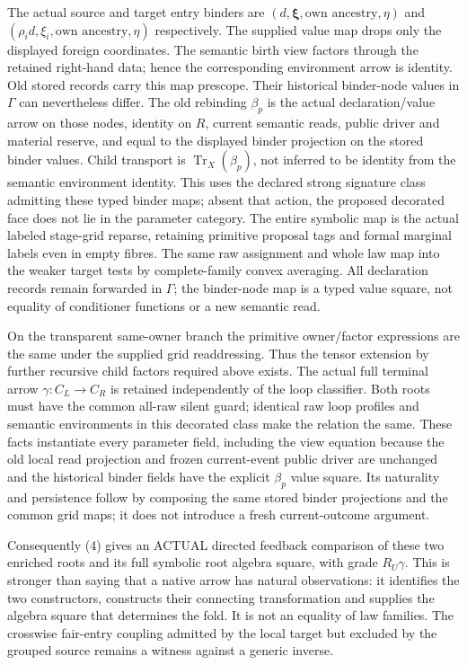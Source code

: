 \documentclass[11pt]{article}
\begin{document}
The actual source and target entry binders are
$(d,\boldsymbol\xi,\text{own ancestry},\eta)$ and
$(\rho_i d,\xi_i,\text{own ancestry},\eta)$ respectively. The supplied value map drops only the displayed foreign coordinates. The semantic birth view factors through the retained right-hand data; hence the corresponding environment arrow is identity. Old stored records carry this map prescope. Their historical binder-node values in $\Gamma$ can nevertheless differ. The old rebinding $\beta_p$ is the actual declaration/value arrow on those nodes, identity on $R$, current semantic reads, public driver and material reserve, and equal to the displayed binder projection on the stored binder values. Child transport is $\operatorname{Tr}_X(\beta_p)$, not inferred to be identity from the semantic environment identity. This uses the declared strong signature class admitting these typed binder maps; absent that action, the proposed decorated face does not lie in the parameter category. The entire symbolic map is the actual labeled stage-grid reparse, retaining primitive proposal tags and formal marginal labels even in empty fibres. The same raw assignment and whole law map into the weaker target tests by complete-family convex averaging. All declaration records remain forwarded in $\Gamma$; the binder-node map is a typed value square, not equality of conditioner functions or a new semantic read.

On the transparent same-owner branch the primitive owner/factor expressions are the same under the supplied grid readdressing. Thus the tensor extension by further recursive child factors required above exists. The actual full terminal arrow $\gamma:C_L\to C_R$ is retained independently of the loop classifier. Both roots must have the common all-raw silent guard; identical raw loop profiles and semantic environments in this decorated class make the relation the same. These facts instantiate every parameter field, including the view equation because the old local read projection and frozen current-event public driver are unchanged and the historical binder fields have the explicit $\beta_p$ value square. Its naturality and persistence follow by composing the same stored binder projections and the common grid maps; it does not introduce a fresh current-outcome argument.

Consequently (4) gives an ACTUAL directed feedback comparison of these two enriched roots and its full symbolic root algebra square, with grade $R_U\gamma$. This is stronger than saying that a native arrow has natural observations: it identifies the two constructors, constructs their connecting transformation and supplies the algebra square that determines the fold. It is not an equality of law families. The crosswise fair-entry coupling admitted by the local target but excluded by the grouped source remains a witness against a generic inverse.
\end{document}

